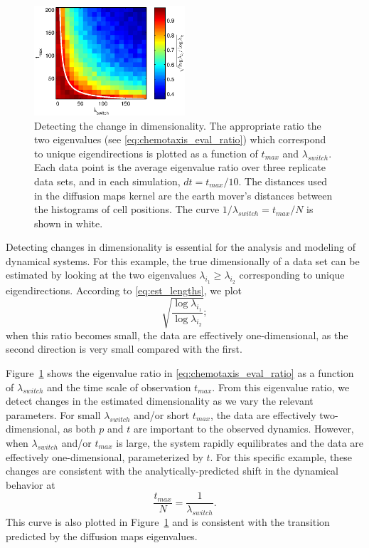 \begin{figure}[t]
%
\centering
\includegraphics[width=0.5\textwidth]{tmax_lambda_transition}
%
\caption[Detecting changes in dimensionality of chemotaxis simulation data]{Detecting the change in dimensionality. The appropriate ratio the two eigenvalues (see \eqref{eq:chemotaxis_eval_ratio}) which correspond to unique eigendirections is plotted as a function of $t_{max}$ and $\lambda_{switch}$. Each data point is the average eigenvalue ratio over three replicate data sets, and in each simulation, $dt=t_{max}/10$. The distances used in the diffusion maps kernel are the earth mover's distances between the histograms of cell positions. The curve $1/\lambda_{switch} = t_{max}/N$ is shown in white. }
%
\label{fig:chemotaxis_compare_timescales_evals}
%
\end{figure}

Detecting changes in dimensionality is essential for the analysis and modeling of dynamical systems.
%
For this example, the true dimensionally of a data set can be estimated by looking at the two eigenvalues $\lambda_{i_1} \ge \lambda_{i_2}$ corresponding to unique eigendirections.
%
According to \eqref{eq:est_lengths}, we plot
\begin{equation}\label{eq:chemotaxis_eval_ratio}
 \sqrt{\frac{\log \lambda_{i_1}}{\log \lambda_{i_2}}} ;
\end{equation}
when this ratio becomes small, the data are effectively one-dimensional, as the second direction is very small compared with the first.

Figure~\ref{fig:chemotaxis_compare_timescales_evals} shows the eigenvalue ratio in \eqref{eq:chemotaxis_eval_ratio} as a function of $\lambda_{switch}$ and the time scale of observation $t_{max}$.
%
From this eigenvalue ratio, we detect changes in the estimated dimensionality as we vary the relevant parameters.
%
For small $\lambda_{switch}$ and/or short $t_{max}$, the data are effectively two-dimensional, as both $p$ and $t$ are important to the observed dynamics.
%
However, when $\lambda_{switch}$ and/or $t_{max}$ is large, the system rapidly equilibrates and the data are effectively one-dimensional, parameterized by $t$.
%
For this specific example, these changes are consistent with the analytically-predicted shift in the dynamical behavior at
\begin{equation}
\frac{t_{max}}{N} = \frac{1}{\lambda_{switch}}.
\end{equation}
%
This curve is also plotted in Figure~\ref{fig:chemotaxis_compare_timescales_evals} and is consistent with the transition predicted by the diffusion maps eigenvalues.


